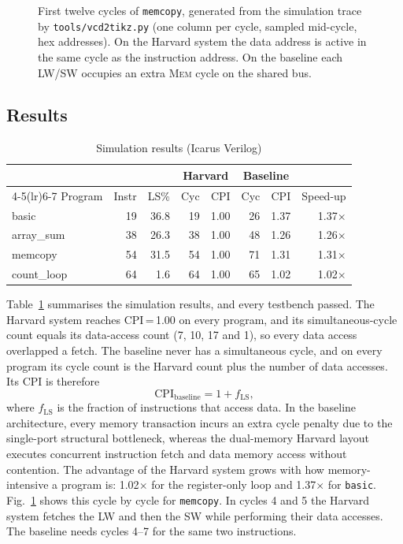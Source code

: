 \documentclass[conference]{IEEEtran}
\newcommand{\sig}[1]{\texttt{#1}}
\begin{document}
\begin{figure}[t]
  \centering
  \resizebox{0.86\textwidth}{!}{}
  \caption{First twelve cycles of \sig{memcopy}, generated from the simulation trace by
  \sig{tools/vcd2tikz.py} (one column per cycle, sampled mid-cycle, hex addresses). On the
  Harvard system the data address is active in the same cycle as the instruction address. On the
  baseline each LW/SW occupies an extra \textsc{Mem} cycle on the shared bus.}
  \label{fig:wave}
\end{figure}

\subsection{Results}
\begin{table}[t]
  \caption{Simulation results (Icarus Verilog)}
  \label{tab:results}
  \centering
  \setlength{\tabcolsep}{3.5pt}
  \begin{tabular}{@{}lrrrrrrr@{}}
    \toprule
    & & & \multicolumn{2}{c}{Harvard} & \multicolumn{2}{c}{Baseline} & \\
    \cmidrule(lr){4-5}\cmidrule(lr){6-7}
    Program & Instr & LS\% & Cyc & CPI & Cyc & CPI & Speed-up \\
    \midrule
    basic      & 19 & 36.8 & 19 & 1.00 & 26 & 1.37 & 1.37$\times$ \\
    array\_sum & 38 & 26.3 & 38 & 1.00 & 48 & 1.26 & 1.26$\times$ \\
    memcopy    & 54 & 31.5 & 54 & 1.00 & 71 & 1.31 & 1.31$\times$ \\
    count\_loop& 64 &  1.6 & 64 & 1.00 & 65 & 1.02 & 1.02$\times$ \\
    \bottomrule
  \end{tabular}
\end{table}

Table~\ref{tab:results} summarises the simulation results, and every testbench passed. The
Harvard system reaches CPI\,=\,1.00 on every program, and its simultaneous-cycle count equals its
data-access count (7, 10, 17 and 1), so every data access overlapped a fetch. The baseline never
has a simultaneous cycle, and on every program its cycle count is the Harvard count plus the
number of data accesses. Its CPI is therefore
\begin{equation}
  \mathrm{CPI}_{\text{baseline}} = 1 + f_{\text{LS}},
\end{equation}
where $f_{\text{LS}}$ is the fraction of instructions that access data. In the baseline architecture,
every memory transaction incurs an extra cycle penalty due to the single-port structural bottleneck,
whereas the dual-memory Harvard layout executes concurrent instruction fetch and data memory access
without contention. The advantage of the Harvard system grows with how memory-intensive a program is:
1.02$\times$ for the register-only loop and 1.37$\times$ for \sig{basic}. Fig.~\ref{fig:wave} shows
this cycle by cycle for \sig{memcopy}. In cycles 4 and 5 the Harvard system fetches the LW and then the SW while
performing their data accesses. The baseline needs cycles 4--7 for the same two instructions.
\end{document}
